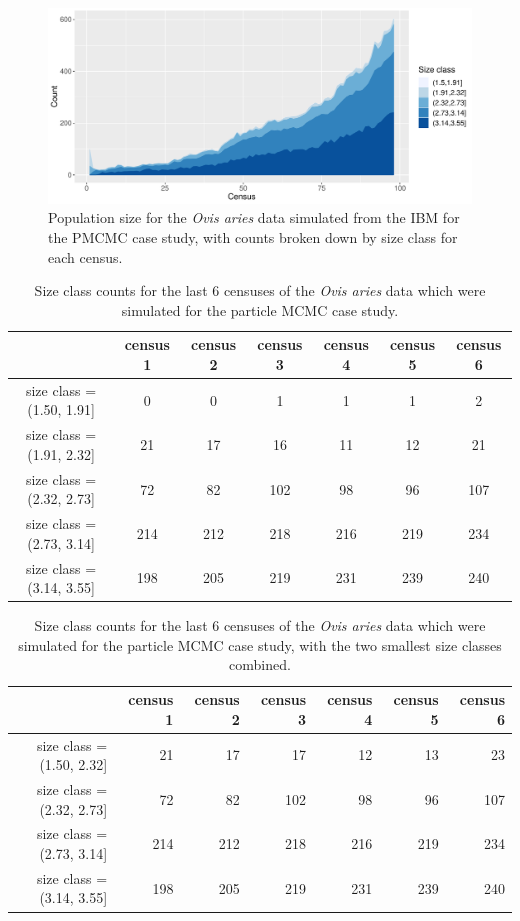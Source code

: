\documentclass[a4paper,12pt]{article}
\begin{document}
\begin{figure}[H]
\centering
\includegraphics[scale=0.68]{simmedDataAllCensuses.pdf}
\caption{\label{simmedDataAll}Population size for the \textit{Ovis aries} data simulated from the IBM for the PMCMC case study, with counts broken down by size class for each census.}
\end{figure}

\vspace{0.5cm}

\begin{table}[ht]
\centering
\begin{tabular}{ccccccc}
  \hline
 & census 1 & census 2 & census 3 & census 4 & census 5 & census 6 \\ 
  \hline
  size class = (1.50, 1.91] & 0 & 0 & 1 & 1 & 1 & 2 \\ 
  size class = (1.91, 2.32] & 21 & 17 & 16 & 11 & 12 & 21 \\ 
  size class = (2.32, 2.73] & 72 & 82 & 102 & 98 & 96 & 107 \\ 
  size class = (2.73, 3.14] & 214 & 212 & 218 & 216 & 219 & 234 \\ 
  size class = (3.14, 3.55] & 198 & 205 & 219 & 231 & 239 & 240 \\ 
   \hline
\end{tabular}
\caption{\label{ungData}Size class counts for the last 6 censuses of the \textit{Ovis aries} data which were simulated for the particle MCMC case study.}
\end{table}

\vspace{0.5cm}

\begin{table}[ht]
\centering
\begin{tabular}{rrrrrrr}
  \hline
 & census 1 & census 2 & census 3 & census 4 & census 5 & census 6 \\ 
  \hline
  size class = (1.50, 2.32] & 21 & 17 & 17 & 12 & 13 & 23 \\ 
  size class = (2.32, 2.73] & 72 & 82 & 102 & 98 & 96 & 107 \\ 
  size class = (2.73, 3.14] & 214 & 212 & 218 & 216 & 219 & 234 \\ 
  size class = (3.14, 3.55] & 198 & 205 & 219 & 231 & 239 & 240 \\ 
   \hline
\end{tabular}
\caption{\label{UngData}Size class counts for the last 6 censuses of the \textit{Ovis aries} data which were simulated for the particle MCMC case study, with the two smallest size classes combined.}
\end{table}
\end{document}
